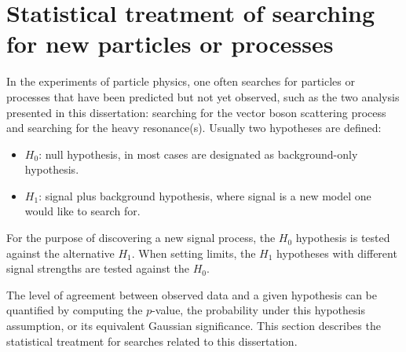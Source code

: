 \chapter{Statistical treatment of searching for new particles or processes}
\label{sec:statisticalfit}

In the experiments of particle physics, one often searches for particles or processes that have been predicted but not yet observed, such as the two analysis presented in this dissertation: searching for the vector boson scattering process and searching for the heavy resonance(s).
Usually two hypotheses are defined:
\begin{itemize}
    \item $H_{0}$: null hypothesis, in most cases are designated as background-only hypothesis.
    \item $H_{1}$: signal plus background hypothesis, where signal is a new model one would like to search for.
\end{itemize}
For the purpose of discovering a new signal process, the $H_{0}$ hypothesis is tested against the alternative $H_{1}$.
When setting limits, the $H_{1}$ hypotheses with different signal strengths are tested against the $H_{0}$.

The level of agreement between observed data and a given hypothesis can be quantified by computing the $p$-value, the probability under this hypothesis assumption, or its equivalent Gaussian significance.
This section describes the statistical treatment for searches related to this dissertation.





